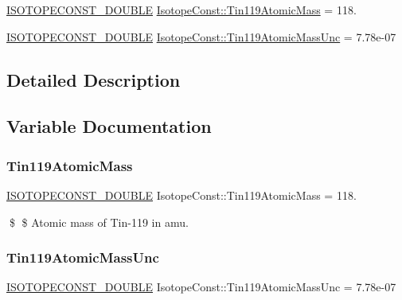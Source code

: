 \begin{DoxyCompactItemize}
\item 
\mbox{\hyperlink{group___isotope_const-_macros_ga8f45a7272ce02c0b4c65c44636ed719a}{I\+S\+O\+T\+O\+P\+E\+C\+O\+N\+S\+T\+\_\+\+D\+O\+U\+B\+LE}} \mbox{\hyperlink{group___isotope_const-_tin-_sn119_ga75a390547ccb3f6c79b3560a365a4236}{Isotope\+Const\+::\+Tin119\+Atomic\+Mass}} = 118.
\item 
\mbox{\hyperlink{group___isotope_const-_macros_ga8f45a7272ce02c0b4c65c44636ed719a}{I\+S\+O\+T\+O\+P\+E\+C\+O\+N\+S\+T\+\_\+\+D\+O\+U\+B\+LE}} \mbox{\hyperlink{group___isotope_const-_tin-_sn119_ga1dd8cc9f64b0e53f2dfb1426edd6cd06}{Isotope\+Const\+::\+Tin119\+Atomic\+Mass\+Unc}} = 7.\+78e-\/07
\end{DoxyCompactItemize}


\subsection{Detailed Description}


\subsection{Variable Documentation}
\mbox{\label{group___isotope_const-_tin-_sn119_ga75a390547ccb3f6c79b3560a365a4236}} 
\subsubsection{\texorpdfstring{Tin119\+Atomic\+Mass}{Tin119AtomicMass}}
{\footnotesize\ttfamily \mbox{\hyperlink{group___isotope_const-_macros_ga8f45a7272ce02c0b4c65c44636ed719a}{I\+S\+O\+T\+O\+P\+E\+C\+O\+N\+S\+T\+\_\+\+D\+O\+U\+B\+LE}} Isotope\+Const\+::\+Tin119\+Atomic\+Mass = 118.}

\$ \$ Atomic mass of Tin-\/119 in amu. \mbox{\label{group___isotope_const-_tin-_sn119_ga1dd8cc9f64b0e53f2dfb1426edd6cd06}} 
\subsubsection{\texorpdfstring{Tin119\+Atomic\+Mass\+Unc}{Tin119AtomicMassUnc}}
{\footnotesize\ttfamily \mbox{\hyperlink{group___isotope_const-_macros_ga8f45a7272ce02c0b4c65c44636ed719a}{I\+S\+O\+T\+O\+P\+E\+C\+O\+N\+S\+T\+\_\+\+D\+O\+U\+B\+LE}} Isotope\+Const\+::\+Tin119\+Atomic\+Mass\+Unc = 7.\+78e-\/07}

